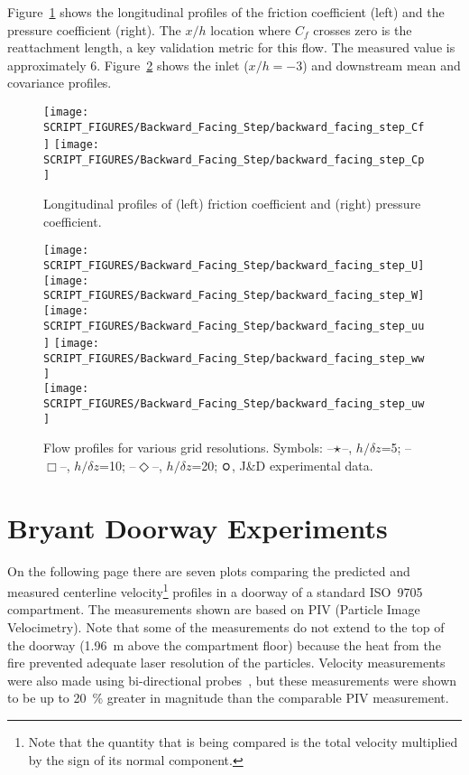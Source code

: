 Figure~\ref{fig:friction_pressure_coefficients} shows the longitudinal profiles of the friction coefficient (left) and the pressure coefficient (right).  The $x/h$ location where $C_f$ crosses zero is the reattachment length, a key validation metric for this flow. The measured value is approximately 6. Figure~\ref{fig:flow_profiles} shows the inlet ($x/h=-3$) and downstream mean and covariance profiles.

\begin{figure}[!htb]
    \centering
    \texttt{[image: SCRIPT\_FIGURES/Backward\_Facing\_Step/backward\_facing\_step\_Cf]}
    \texttt{[image: SCRIPT\_FIGURES/Backward\_Facing\_Step/backward\_facing\_step\_Cp]}
    \caption[Friction coefficient and pressure coefficient]{Longitudinal profiles of (left) friction coefficient and (right) pressure coefficient.}
    \label{fig:friction_pressure_coefficients}
\end{figure}

\begin{figure}[!htb]
    \centering
    \texttt{[image: SCRIPT\_FIGURES/Backward\_Facing\_Step/backward\_facing\_step\_U]}
    \texttt{[image: SCRIPT\_FIGURES/Backward\_Facing\_Step/backward\_facing\_step\_W]}\\
    \texttt{[image: SCRIPT\_FIGURES/Backward\_Facing\_Step/backward\_facing\_step\_uu]}
    \texttt{[image: SCRIPT\_FIGURES/Backward\_Facing\_Step/backward\_facing\_step\_ww]}\\
    \texttt{[image: SCRIPT\_FIGURES/Backward\_Facing\_Step/backward\_facing\_step\_uw]}
    \caption[Backward facing step flow profiles]{Flow profiles for various grid resolutions.  Symbols: --$\mathlarger{\mathlarger{\star}}$--, $h/\delta z$=5; --$\Box$--, $h/\delta z$=10; --$\Diamond$--, $h/\delta z$=20; $\mathlarger{\mathlarger{\boldsymbol\circ}}$, J\&D experimental data.}
    \label{fig:flow_profiles}
\end{figure}


\clearpage

\section{Bryant Doorway Experiments}

On the following page there are seven plots comparing the predicted and measured centerline velocity\footnote{Note that the quantity that is being compared is the total velocity multiplied by the sign of its normal component.} profiles in a doorway of a standard ISO~9705 compartment. The measurements shown are based on PIV (Particle Image Velocimetry). Note that some of the measurements do not extend to the top of the doorway (1.96~m above the compartment floor) because the heat from the fire prevented adequate laser resolution of the particles. Velocity measurements were also made using bi-directional probes~\cite{Bryant:FSJ2009}, but these measurements were shown to be up to 20~\% greater in magnitude than the comparable PIV measurement.

